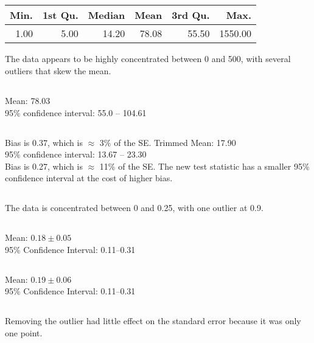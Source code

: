 \documentclass[twocolumn]{article}
\begin{document}


\clearpage



\newpage

\subsection{}
\begin{table}[h]
\begin{tabular}{@{}rrrrrr@{}}
\toprule
Min. & 1st Qu. & Median & Mean  & 3rd Qu. & Max.    \\ \midrule
1.00 & 5.00    & 14.20  & 78.08 & 55.50   & 1550.00 \\ \bottomrule
\end{tabular}
\end{table}
The data appears to be highly concentrated between 0 and 500, with several outliers that skew the mean.

\subsection{}
Mean: 78.03\\
95\% confidence interval: 55.0 -- 104.61
\subsection{}
Bias is 0.37, which is $\approx$ 3\% of the SE.
Trimmed Mean: 17.90\\
95\% confidence interval: 13.67 -- 23.30\\
Bias is 0.27, which is $\approx$ 11\% of the SE.
The new test statistic has a smaller 95\% confidence interval at the cost of higher bias.


\subsection{}
The data is concentrated between 0 and 0.25, with one outlier at 0.9.
\subsection{}
Mean: $0.18\pm 0.05$\\
95\% Confidence Interval: 0.11--0.31
\subsection{}
Mean: $0.19\pm 0.06$\\
95\% Confidence Interval: 0.11--0.31
\subsection{}
Removing the outlier had little effect on the standard error because it was only one point.
\end{document}
